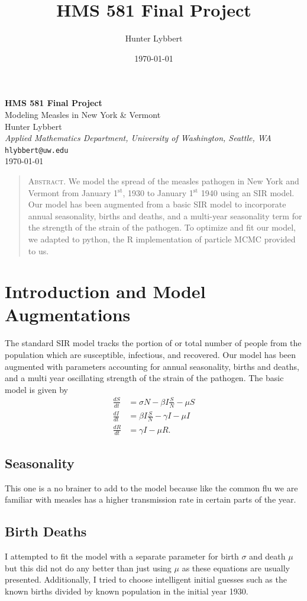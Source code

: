 \documentclass[11pt]{amsart}
\title{HMS 581 Final Project}
\author{Hunter Lybbert}
\date{\today}
\begin{document}
\begin{center}
    {\LARGE \textbf{HMS 581 Final Project}}\\[1ex]
    {\large Modeling Measles in New York \& Vermont}\\[4ex]
    {\Large Hunter Lybbert}\\[2ex]
    \textit{Applied Mathematics Department, University of Washington, Seattle, WA}\\[1ex]
    \texttt{hlybbert@uw.edu}\\[1ex]
    \today
\end{center}

\vspace{2ex}
\begin{quote}
A\textsc{bstract.}
\small We model the spread of the measles pathogen in New York and Vermont from January 1$^{\text{st}}$, 1930 to January 1$^{\text{st}}$ 1940 using an SIR model.
Our model has been augmented from a basic SIR model to incorporate annual seasonality, births and deaths, and a multi-year seasonality term for the strength of the strain of the pathogen.
To optimize and fit our model, we adapted to python, the R implementation of particle MCMC provided to us.
\end{quote}

\section{Introduction and Model Augmentations}\label{sec:augmentations}
The standard SIR model tracks the portion of or total number of people from the population which are susceptible, infectious, and recovered.
Our model has been augmented with parameters accounting for annual seasonality, births and deaths, and a multi year oscillating strength of the strain of the pathogen. The basic model is given by
\begin{align*}
\frac{dS}{dt} &= \sigma N - \beta I \frac S N - \mu S \\
\frac{dI}{dt} &= \beta I \frac S N - \gamma I - \mu I \\
\frac{dR}{dt} &= \gamma I - \mu R.
\end{align*}
\subsection{Seasonality} This one is a no brainer to add to the model because like the common flu we are familiar with measles has a higher transmission rate in certain parts of the year.
\subsection{Birth Deaths}
I attempted to fit the model with a separate parameter for birth $\sigma$ and death $\mu$ but this did not do any better than just using $\mu$ as these equations are usually presented.
Additionally, I tried to choose intelligent initial guesses such as the known births divided by known population in the initial year 1930.
\end{document}
